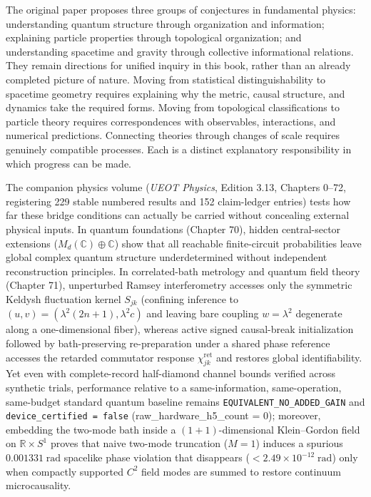 \documentclass[
  english,
  11pt,
  oneside]{book}
\begin{document}
The original paper proposes three groups of conjectures in fundamental physics: understanding quantum structure through organization and information; explaining particle properties through topological organization; and understanding spacetime and gravity through collective informational relations. They remain directions for unified inquiry in this book, rather than an already completed picture of nature. Moving from statistical distinguishability to spacetime geometry requires explaining why the metric, causal structure, and dynamics take the required forms. Moving from topological classifications to particle theory requires correspondences with observables, interactions, and numerical predictions. Connecting theories through changes of scale requires genuinely compatible processes. Each is a distinct explanatory responsibility in which progress can be made.

The companion physics volume (\emph{UEOT Physics}, Edition 3.13, Chapters 0--72, registering 229 stable numbered results and 152 claim-ledger entries) tests how far these bridge conditions can actually be carried without concealing external physical inputs. In quantum foundations (Chapter 70), hidden central-sector extensions (\(M_d(\mathbb{C}) \oplus \mathbb{C}\)) show that all reachable finite-circuit probabilities leave global complex quantum structure underdetermined without independent reconstruction principles. In correlated-bath metrology and quantum field theory (Chapter 71), unperturbed Ramsey interferometry accesses only the symmetric Keldysh fluctuation kernel \(S_{jk}\) (confining inference to \((u, v) = (\lambda^2(2n+1), \lambda^2 c)\) and leaving bare coupling \(w = \lambda^2\) degenerate along a one-dimensional fiber), whereas active signed causal-break initialization followed by bath-preserving re-preparation under a shared phase reference accesses the retarded commutator response \(\chi^{\mathrm{ret}}_{jk}\) and restores global identifiability. Yet even with complete-record half-diamond channel bounds verified across synthetic trials, performance relative to a same-information, same-operation, same-budget standard quantum baseline remains \texttt{EQUIVALENT\_NO\_ADDED\_GAIN} and \texttt{device\_certified\ =\ false} (raw\_hardware\_h5\_count = 0); moreover, embedding the two-mode bath inside a \((1+1)\)-dimensional Klein--Gordon field on \(\mathbb{R} \times S^1\) proves that naive two-mode truncation (\(M=1\)) induces a spurious \(0.001331\;\mathrm{rad}\) spacelike phase violation that disappears (\(< 2.49 \times 10^{-12}\;\mathrm{rad}\)) only when compactly supported \(C^2\) field modes are summed to restore continuum microcausality.
\end{document}
